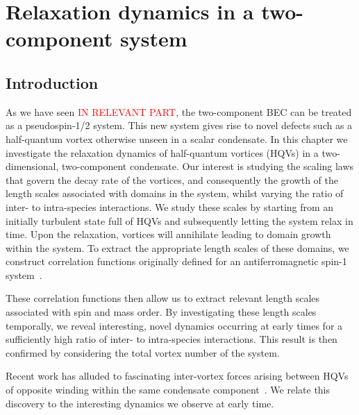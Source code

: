\chapter{Relaxation dynamics in a two-component system}

\section{Introduction}
As we have seen \textcolor{red}{IN RELEVANT PART}, the two-component BEC can be 
treated as a pseudospin-1/2 system. 
This new system gives rise to novel defects such as a half-quantum vortex 
otherwise unseen in a scalar condensate. 
In this chapter we investigate the relaxation dynamics of half-quantum vortices 
(HQVs) in a two-dimensional, two-component condensate. 
Our interest is studying the scaling laws that govern the decay rate of the 
vortices, and consequently the growth of the length scales associated with 
domains in the system, whilst varying the ratio of inter- to intra-species 
interactions. 
We study these scales by starting from an initially turbulent state full of 
HQVs and subsequently letting the system relax in time. 
Upon the relaxation, vortices will annihilate leading to domain growth within 
the system.
To extract the appropriate length scales of these domains, we construct 
correlation functions originally defined for an antiferromagnetic spin-1 
system~\cite{Symes2017}.

These correlation functions then allow us to extract relevant length scales 
associated with spin and mass order. 
By investigating these length scales temporally, we reveal interesting, 
novel dynamics occurring at early times for a sufficiently high ratio of 
inter- to intra-species interactions. 
This result is then confirmed by considering the total vortex number of the 
system. 
\par
Recent work has alluded to fascinating inter-vortex forces arising between HQVs 
of opposite winding within the same condensate 
component~\cite{Eto2011,Kasamatsu2016}.
We relate this discovery to the interesting 
dynamics we observe at early time.
